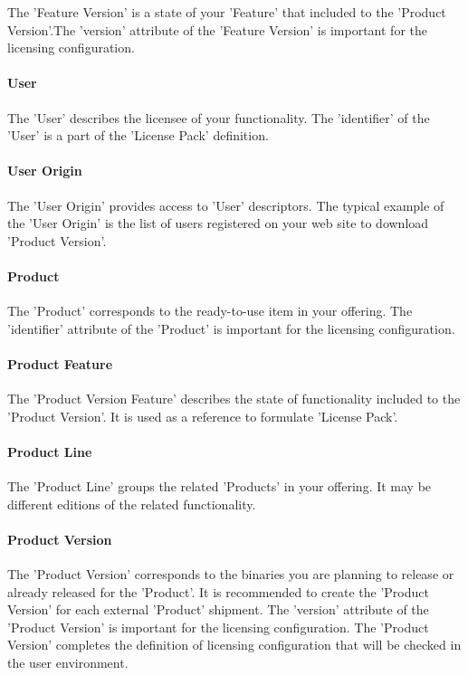 \documentclass[12pt]{report}
\begin{document}
The 'Feature Version' is a state of your 'Feature' that included to the 'Product Version'.The 'version' attribute of the 'Feature Version' is important for the licensing configuration.

\paragraph*{User}

The 'User' describes the licensee of your functionality. The 'identifier' of the 'User' is a part of the 'License Pack' definition.

\paragraph*{User Origin}

The 'User Origin' provides access to 'User' descriptors. The typical example of the 'User Origin' is the list of users registered on your web site to download 'Product Version'.

\paragraph*{Product}

The 'Product' corresponds to the ready-to-use item in your offering. The 'identifier' attribute of the 'Product' is important for the licensing configuration. 

\paragraph*{Product Feature}

The 'Product Version Feature' describes the state of functionality included to the 'Product Version'. It is used as a reference to formulate 'License Pack'. 

\paragraph*{Product Line}

The 'Product Line' groups the related 'Products' in your offering. It may be different editions of the related functionality.

\paragraph*{Product Version}

The 'Product Version' corresponds to the binaries you are planning to release or already released for the 'Product'. It is recommended to create the 'Product Version' for each external 'Product' shipment. The 'version' attribute of the 'Product Version' is important for the licensing configuration. The 'Product Version' completes the definition of licensing configuration that will be checked in the user environment. 
\end{document}
